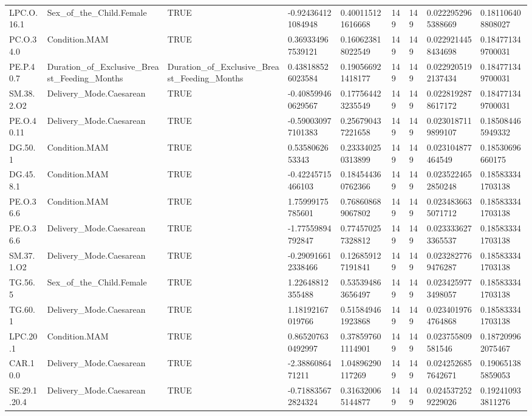 \begin{longtable}{lllllllll}
LPC.O.16.1 & Sex\_of\_the\_Child.Female & TRUE & -0.924364121084948 & 0.400115121616668 & 149 & 149 & 0.0222952965388669 & 0.181106408808027 \\
PC.O.34.0 & Condition.MAM & TRUE & 0.369334967539121 & 0.160623818022549 & 149 & 149 & 0.0229214458434698 & 0.184771349700031 \\
PE.P.40.7 & Duration\_of\_Exclusive\_Breast\_Feeding\_Months & Duration\_of\_Exclusive\_Breast\_Feeding\_Months & 0.438188526023584 & 0.190566921418177 & 149 & 149 & 0.0229205192137434 & 0.184771349700031 \\
SM.38.2.O2 & Delivery\_Mode.Caesarean & TRUE & -0.408599460629567 & 0.177564423235549 & 149 & 149 & 0.0228192878617172 & 0.184771349700031 \\
PE.O.40.11 & Delivery\_Mode.Caesarean & TRUE & -0.590030977101383 & 0.256790437221658 & 149 & 149 & 0.0230187119899107 & 0.185084465949332 \\
DG.50.1 & Condition.MAM & TRUE & 0.5358062653343 & 0.233340250313899 & 149 & 149 & 0.023104877464549 & 0.18530696660175 \\
DG.45.8.1 & Condition.MAM & TRUE & -0.42245715466103 & 0.184544360762366 & 149 & 149 & 0.0235224652850248 & 0.185833341703138 \\
PE.O.36.6 & Condition.MAM & TRUE & 1.75999175785601 & 0.768608689067802 & 149 & 149 & 0.0234836635071712 & 0.185833341703138 \\
PE.O.36.6 & Delivery\_Mode.Caesarean & TRUE & -1.77559894792847 & 0.774570257328812 & 149 & 149 & 0.0233336273365537 & 0.185833341703138 \\
SM.37.1.O2 & Delivery\_Mode.Caesarean & TRUE & -0.290916612338466 & 0.126859127191841 & 149 & 149 & 0.0232827769476287 & 0.185833341703138 \\
TG.56.5 & Sex\_of\_the\_Child.Female & TRUE & 1.22648812355488 & 0.535394863656497 & 149 & 149 & 0.0234259773498057 & 0.185833341703138 \\
TG.60.1 & Delivery\_Mode.Caesarean & TRUE & 1.18192167019766 & 0.515849461923868 & 149 & 149 & 0.0234019764764868 & 0.185833341703138 \\
LPC.20.1 & Condition.MAM & TRUE & 0.865207630492997 & 0.378597601114901 & 149 & 149 & 0.023755809581546 & 0.187209962075467 \\
CAR.10.0 & Delivery\_Mode.Caesarean & TRUE & -2.3886086471211 & 1.04896290117269 & 149 & 149 & 0.0242526857642671 & 0.190651385859053 \\
SE.29.1.20.4 & Delivery\_Mode.Caesarean & TRUE & -0.718835672824324 & 0.316320065144877 & 149 & 149 & 0.0245372529229026 & 0.192410933811276 \\

\end{longtable}
